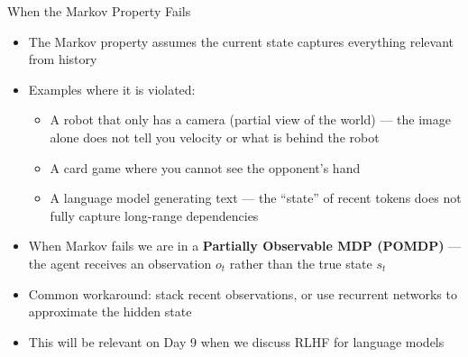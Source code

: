 \begin{frame}{When the Markov Property Fails}
\begin{itemize}
    \item The Markov property assumes the current state captures everything relevant from history
    \item Examples where it is violated:
    \begin{itemize}
        \item A robot that only has a camera (partial view of the world) --- the image alone does not tell you velocity or what is behind the robot
        \item A card game where you cannot see the opponent's hand
        \item A language model generating text --- the ``state'' of recent tokens does not fully capture long-range dependencies
    \end{itemize}
    \item When Markov fails we are in a \textbf{Partially Observable MDP (POMDP)} --- the agent receives an observation $o_t$ rather than the true state $s_t$
    \item Common workaround: stack recent observations, or use recurrent networks to approximate the hidden state
    \item This will be relevant on Day 9 when we discuss RLHF for language models
\end{itemize}
\end{frame}